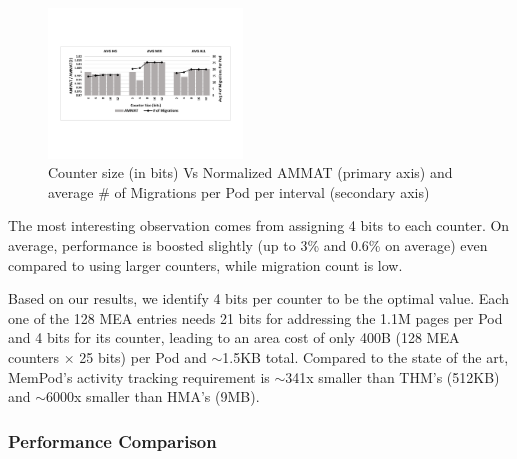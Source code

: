\begin{figure}[h]
  \includegraphics[width=0.46\textwidth]{figures/revised/old/ctr_size.pdf}
  \caption{Counter size (in bits) Vs Normalized AMMAT (primary axis) and average \# of Migrations per Pod per interval (secondary axis)}
  \label{fig:counter_size}
\end{figure}

The most interesting observation comes from assigning 4 bits to each counter. On average, performance is boosted slightly (up to 3\% and 0.6\% on average) even compared to using larger counters, while migration count is low. %

Based on our results, we identify 4 bits per counter to be the optimal value. Each one of the 128 MEA entries needs 21 bits for addressing the 1.1M pages per Pod and 4 bits for its counter, leading to an area cost of only 400B (128 MEA counters $\times$ 25 bits) per Pod and $\sim$1.5KB total. Compared to the state of the art, MemPod's activity tracking requirement is $\sim$341x smaller than THM's (512KB) and $\sim$6000x smaller than HMA's (9MB).

\subsubsection{Performance Comparison}
\label{sub:performance}

